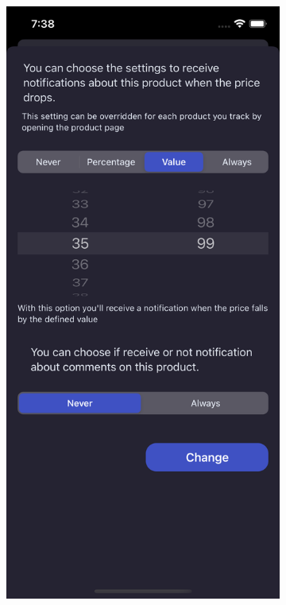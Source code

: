 \begin{figure}[h!]
        \centering
        \begin{subfigure}[b]{0.3\textwidth}
            \centering
            \includegraphics[width=\textwidth]{images/interfaces/value_notification_screen.png}

\end{subfigure}
\end{figure}
